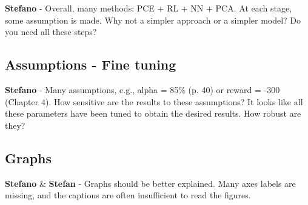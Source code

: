 \documentclass[12pt,a4paper]{article}
\begin{document}
\begin{mdframed}[style=comment] %
{\color{orange} \textbf{Stefano}} - Overall, many methods: PCE + RL + NN + PCA. At each stage, some assumption is made. Why not a simpler approach or a simpler model? Do you need all these steps? 
\end{mdframed}

\noindent

\begin{mdframed}[style=manuscript] %

\end{mdframed}

\subsection{Assumptions - Fine tuning}
\label{fine_tuning}

\begin{mdframed}[style=comment] %
{\color{orange} \textbf{Stefano}} - Many assumptions, e.g., alpha = 85\% (p. 40) or reward = -300 (Chapter 4). How sensitive are the results to these assumptions? It looks like all these parameters have been tuned to obtain the desired results. How robust are they?
\end{mdframed}

\noindent

\begin{mdframed}[style=manuscript] %

\end{mdframed}

\subsection{Graphs}
\label{general_graphs}

\begin{mdframed}[style=comment] %
{\color{orange} \textbf{Stefano}} \& {\color{teal} \textbf{Stefan}} - Graphs should be better explained. Many axes labels are missing, and the captions are often insufficient to read the figures. 
\end{mdframed}

\noindent

\begin{mdframed}[style=manuscript] %

\end{mdframed}
\end{document}
